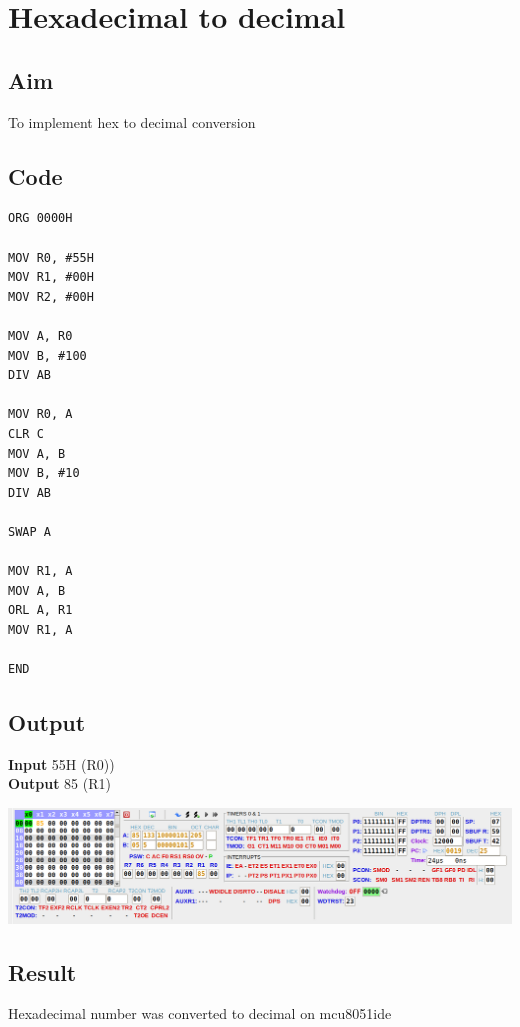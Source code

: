\section{Hexadecimal to decimal}
\subsection{Aim}
To implement hex to decimal conversion

\subsection{Code}
\begin{lstlisting}
ORG 0000H

MOV R0, #55H
MOV R1, #00H
MOV R2, #00H

MOV A, R0
MOV B, #100
DIV AB

MOV R0, A
CLR C
MOV A, B
MOV B, #10
DIV AB

SWAP A

MOV R1, A
MOV A, B
ORL A, R1
MOV R1, A

END
\end{lstlisting}

\subsection{Output}
\textbf{Input} 55H (R0))\\
\textbf{Output} 85 (R1)\\
\begin{center}
	\includegraphics[width=\textwidth]{img/p31.png}
\end{center}


\subsection{Result}
Hexadecimal number was converted to decimal on mcu8051ide